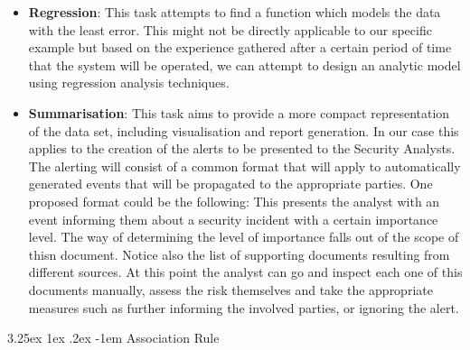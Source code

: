 \documentclass[12pt]{article}
\makeatletter
\newcounter{subsubsubsection}[subsubsection]
\renewcommand\paragraph{\@startsection{paragraph}{5}{\z@}%
  {3.25ex \@plus1ex \@minus.2ex}%
  {-1em}%
  {\normalfont\normalsize\bfseries}}
\makeatother
\begin{document}
\begin{itemize}
\item
\textbf{Regression}: This task attempts to find a function which models the data with the least error.
This might not be directly applicable to our specific example but based on the experience
gathered after a certain period of time that the system will be operated, we can attempt to
design an analytic model using regression analysis techniques.
\item
\textbf{Summarisation}: This task aims to provide a more compact representation of the data set, including visualisation and report generation. In our case this applies to the creation of the alerts to be presented to the Security Analysts. The alerting will consist of a common format that will apply to automatically generated events that will be propagated to the appropriate parties. One proposed format could be the following:
This presents the analyst with an event informing them about a security incident with a certain importance level. The way of determining the level of importance falls out of the scope of thisn document. Notice also the list of supporting documents resulting from different sources. At this point the analyst can go and inspect each one of this documents manually, assess the risk themselves and take the appropriate measures such as further informing the involved parties, or ignoring the alert.
\end{itemize}
\paragraph{Association Rule}
\end{document}
